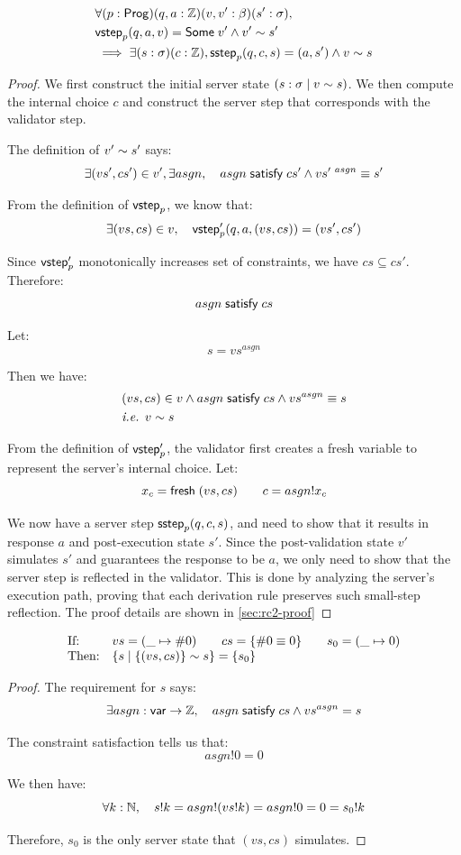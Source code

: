\begin{lemma}[\ref{eq:rc2}]
\begin{align*}
&\forall(p:\mathsf{Prog})(q,a:\mathbb Z)(v,v':\beta)(s':\sigma),\\
&\mathsf{vstep}_p(q,a,v)=\mathsf{Some}\;v'\wedge v'\sim s'\\
&\implies\exists(s:\sigma)(c:\mathbb Z),\mathsf{sstep}_p(q,c,s)=(a,s')\wedge v\sim s
\end{align*}
\begin{proof}
We first construct the initial server state $(s:\sigma\mid v\sim s)$.  We
then compute the internal choice $c$ and construct the server step that
corresponds with the validator step.

The definition of $v'\sim s'$ says:
\[\exists (vs',cs')\in v',\exists asgn,\quad asgn\;\mathsf{satisfy}\;cs'\wedge vs'^{~asgn}\equiv s'\]

From the definition of $\mathsf{vstep}_p$, we know that:
\[\exists (vs,cs)\in v,\quad \mathsf{vstep}'_p(q,a,(vs,cs))=(vs',cs')\]

Since $\mathsf{vstep}'_p$ monotonically increases set of constraints, we have
$cs\subseteq cs'$.  Therefore: \[asgn\;\mathsf{satisfy}\;cs\]

Let: \[s=vs^{asgn}\]

Then we have:
\begin{align*}
&(vs,cs)\in v\wedge asgn\;\mathsf{satisfy}\;cs\wedge vs^{asgn}\equiv s\\
&\textit{i.e. }v\sim s
\end{align*}

From the definition of $\mathsf{vstep}'_p$, the validator first creates a fresh variable
to represent the server's internal choice.  Let:
\[x_c=\mathsf{fresh}\;(vs,cs)\qquad c=asgn!x_c\]

We now have a server step $\mathsf{sstep}_p(q,c,s)$, and need to show that it results in
response $a$ and post-execution state $s'$.  Since the post-validation state
$v'$ simulates $s'$ and guarantees the response to be $a$, we only need to show
that the server step is reflected in the validator.  This is done by analyzing
the server's execution path, proving that each derivation rule preserves such
small-step reflection.  The proof details are shown in \autoref{sec:rc2-proof}
\end{proof}
\end{lemma}

\begin{lemma}[\ref{eq:rc3}]
\[\begin{array}{ll}
\text{If:}&
vs=(\_\mapsto\#0)\qquad
cs=\{\#0\equiv0\}\qquad
s_0=(\_\mapsto0)\\
\text{Then:}&\{s\mid\{(vs,cs)\}\sim s\}=\{s_0\}
\end{array}\]
\begin{proof}
The requirement for $s$ says:
\[\exists asgn:\mathsf{var}\to\mathbb Z,\quad asgn\;\mathsf{satisfy}\;cs\wedge vs^{asgn}=s\]

The constraint satisfaction tells us that:
\[asgn!0=0\]

We then have:
\[\forall k:\mathbb N,\quad s!k=asgn!(vs!k)=asgn!0=0=s_0!k\]

Therefore, $s_0$ is the only server state that $(vs,cs)$ simulates.
\end{proof}
\end{lemma}

